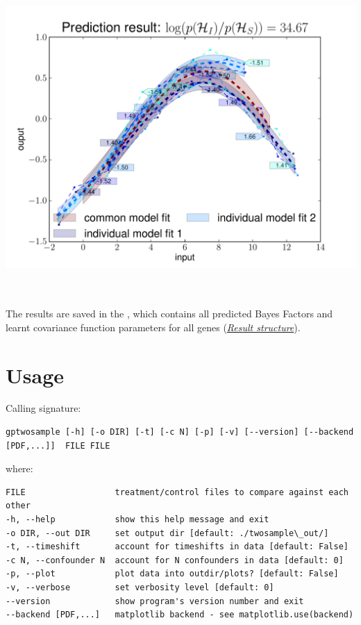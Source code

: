 \documentclass[letterpaper,10pt,english]{sphinxmanual}
\begin{document}
\includegraphics[height=12cm]{timeshiftexample.pdf}

The results are saved in the , which contains all
predicted Bayes Factors and learnt covariance function parameters for
all genes ({\hyperref[results:results]{\emph{Result structure}}}).


\chapter{Usage}
\label{usage:usage}\label{usage::doc}\label{usage:id1}
Calling signature:

\begin{Verbatim}[commandchars=\\\{\}]
gptwosample [-h] [-o DIR] [-t] [-c N] [-p] [-v] [--version] [--backend [PDF,...]]  FILE FILE
\end{Verbatim}

where:

\begin{Verbatim}[commandchars=\\\{\}]
FILE                  treatment/control files to compare against each other
-h, --help            show this help message and exit
-o DIR, --out DIR     set output dir [default: ./twosample\_out/]
-t, --timeshift       account for timeshifts in data [default: False]
-c N, --confounder N  account for N confounders in data [default: 0]
-p, --plot            plot data into outdir/plots? [default: False]
-v, --verbose         set verbosity level [default: 0]
--version             show program's version number and exit
--backend [PDF,...]   matplotlib backend - see matplotlib.use(backend)
\end{Verbatim}
\end{document}

